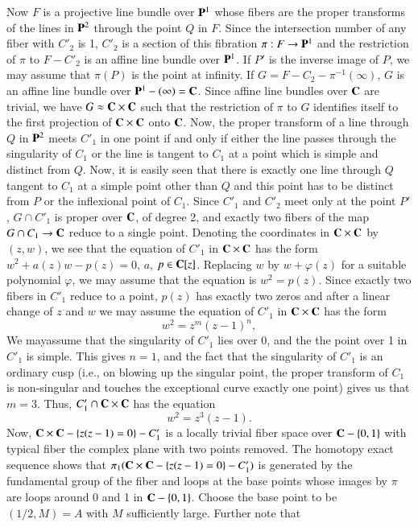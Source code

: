 Now $F$ is a projective line bundle over $\mathbf{P}^1$ whose fibers are the proper transforms of the lines in $\mathbf{P}^2$ through the point $Q$ in $F$. Since the intersection number of any fiber with $C'_2$ is 1, $C'_2$ is a section of this fibration  $\pi: F \to \mathbf{P}^1$ and the restriction of $\pi$ to $F - C'_2$ is an affine line bundle over $\mathbf{P}^1$. If $P'$ is the inverse image of $P$, we may assume that $\pi(P)$ is the point at infinity. If $G = F - C_2 - \pi^{-1} (\infty)$, $G$ is an affine line bundle over $\mathbf{P}^1 - (\infty) = \mathbf{C}$. Since affine line bundles over $\mathbf{C}$ are trivial, we have $G \approx \mathbf{C} \times \mathbf{C}$ such that the restriction of $\pi$ to $G$ identifies itself to the first projection of $\mathbf{C} \times \mathbf{C}$ onto $\mathbf{C}$. Now, the proper transform of a line through $Q$ in $\mathbf{P}^2$ meets $C'_1$ in one point if and only if either the line passes through the singularity of $C_1$ or the line is tangent to $C_1$ at a point which is simple and distinct from $Q$. Now, it is easily seen that there is exactly one line through $Q$ tangent to $C_1$ at a simple point other than $Q$ and this point has to be distinct from $P$ or the inflexional point of $C_1$. Since $C'_1$ and $C'_2$ meet only at the point $P'$, $G \cap C'_1$ is proper over $\mathbf{C}$, of degree 2, and exactly two fibers of the map $G \cap C_1 \to \mathbf{C}$ reduce to a single point. Denoting the coordinates in $\mathbf{C} \times \mathbf{C}$ by $(z,w)$, we see that the equation of $C'_1$ in $\mathbf{C} \times \mathbf{C}$ has the form $w^2 + a(z) w - p(z) =0$, $a$, $p \in \mathbf{C} [z]$. Replacing $w$ by $w + \varphi (z)$ for a suitable polynomial $\varphi$, we may assume that the equation is $w^2 = p(z)$. Since exactly two fibers in $C'_1$ reduce to a point, $p(z)$ has exactly two zeros and after a linear change of $z$ and $w$ we may assume the equation of $C'_1$ in $\mathbf{C} \times \mathbf{C}$ has the form 
\begin{equation*}
w^2 = z^m (z-1)^n, \tag*{$m$, $ n \geqq 1$.}
\end{equation*}
 We may\pageoriginale assume that the singularity of $C'_1$ lies over 0, and the the point over 1 in $C'_1$ is simple. This gives $n=1$, and the fact that the singularity of $C'_1$ is an ordinary cusp (i.e., on blowing up the singular point, the proper transform of $C_1$ is non-singular and touches the exceptional curve exactly one point) gives us that $m=3$. Thus, $C'_1 \cap \mathbf{C} \times \mathbf{C}$ has the equation
$$
w^2 =z^3 (z-1).
$$
Now, $\mathbf{C} \times \mathbf{C} - \{z (z-1) =0\} - C'_1$ is a locally trivial fiber space over $\mathbf{C} - \{0,1\}$ with typical fiber the complex plane with two points removed. The homotopy exact sequence shows that $\pi_1 (\mathbf{C} \times \mathbf{C} - \{z (z-1) =0\} -C'_1)$ is generated by the fundamental group of the fiber and loops at the base points whose images by $\pi$ are loops around 0 and 1 in $\mathbf{C} - \{0,1\}$. Choose the base point to be $(1/2,M) = A$ with $M$ sufficiently large. Further note that 
